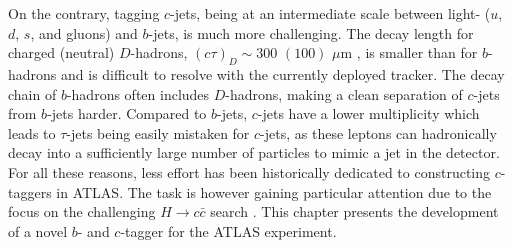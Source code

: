 On the contrary, tagging $c$-jets, being at an intermediate scale between light- ($u$, $d$, $s$, and gluons) and $b$-jets, is much more challenging. The decay length for charged (neutral) $D$-hadrons, $(c\tau)_D \sim 300$ $(100)$ $\mu$m \cite{Tanabashi:2018oca}, is smaller than for $b$-hadrons and is difficult to resolve with the currently deployed tracker. The decay chain of $b$-hadrons often includes $D$-hadrons, making a clean separation of $c$-jets from $b$-jets harder. Compared to $b$-jets, $c$-jets have a lower multiplicity which leads to $\tau$-jets being easily mistaken for $c$-jets, as these leptons can hadronically decay into a sufficiently large number of particles to mimic a jet in the detector. For all these reasons, less effort has been historically dedicated to constructing $c$-taggers in ATLAS. The task is however gaining particular attention due to the focus on the challenging $H \rightarrow c\bar{c}$ search \cite{Aaboud:2018fhh}. This chapter presents the development of a novel $b$- and $c$-tagger for the ATLAS experiment.

